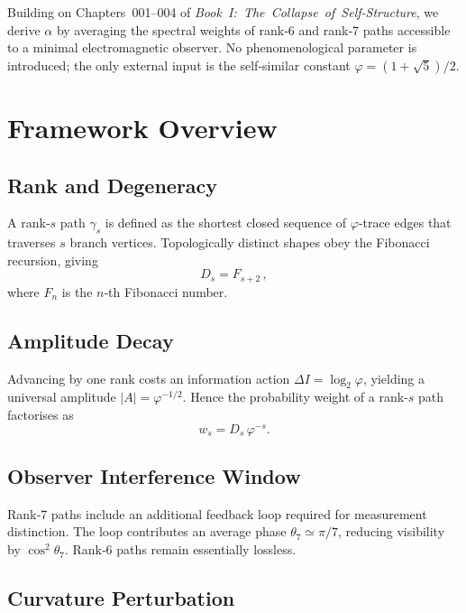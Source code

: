 \documentclass[%
 reprint,
 amsmath,amssymb,
 aps,
 prd,
 nofootinbib,      %
 longbibliography  %
]{revtex4-2}
\begin{document}
Building on Chapters 001–004 of
\emph{Book I: The Collapse of Self‑Structure},
we derive $\alpha$ by averaging the spectral weights of
rank‑6 and rank‑7 paths accessible to a minimal electromagnetic
observer.
No phenomenological parameter is introduced;
the only external input is the self‑similar constant
\(\varphi=(1+\sqrt5)/2\).

\section{Framework Overview}\label{sec:framework}

\subsection{Rank and Degeneracy}

A rank‑$s$ path $\gamma_s$ is defined as the shortest
closed sequence of $\varphi$‑trace edges that
traverses $s$ branch vertices.
Topologically distinct shapes obey the Fibonacci recursion, giving
\begin{equation}
  D_s = F_{s+2}\, ,
  \label{eq:Fibonacci-deg}
\end{equation}
where $F_n$ is the $n$‑th Fibonacci number.

\subsection{Amplitude Decay}

Advancing by one rank costs an information action
$\Delta I = \log_2\varphi$,
yielding a universal amplitude
\(|A|=\varphi^{-1/2}\).
Hence the
probability weight of a rank‑$s$ path factorises as
\begin{equation}
  w_s = D_s\,\varphi^{-s}.
  \label{eq:weight-basic}
\end{equation}

\subsection{Observer Interference Window}

Rank‑7 paths include an additional feedback loop
required for measurement distinction.
The loop contributes an average phase
\(\theta_7\simeq\pi/7\),
reducing visibility by \(\cos^2\theta_7\).
Rank‑6 paths remain essentially lossless.

\subsection{Curvature Perturbation}
\end{document}

